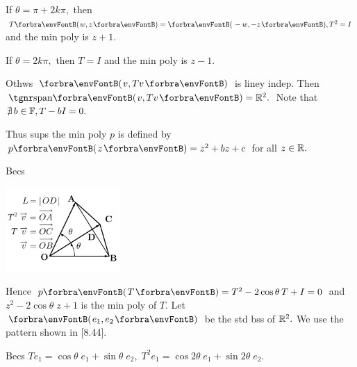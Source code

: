 \par\quad
If $\theta=\pi+2k\pi,$ then $T\Par{w,z}=\Par{-w,-z},T^2=I$ and the min poly is $z+1.$\par\quad
If $\theta=2k\pi,$ then $T=I$ and the min poly is $z-1.$\par\quad
Othws $\Par{v,Tv}$ is liney indep. Then $\Span{v,Tv}=\Rbb^2.$ Note that $\nexists\,b\in{\mathbb{F}},T-bI=0.$\par\quad
\par\vspace{-16pt}\quad
Thus sups the min poly $p$ is defined by $p\Par{z}=z^2+bz+c$ for all $z\in{\mathbb{R}}.$\par\vspace{20pt}\quad
Becs\vspace{-35pt}\par\quad
\hspace{50pt}\includegraphics[width=4.4cm,height=3.2cm,scale=0.22]{diagram5BI-1.png}\par\vspace{-70pt}\quad
{}\par\quad
Hence $p\Par{T}=T^2-2\cos\theta\, T+I=0$ and $z^2-2\cos\theta\;z+1$ is the min poly of $T.$\PfEnd\vspace{6pt}\quad
\Or Let $\Par{e_1,e_2}$ be the std bss of ${\mathbb{R}}^2.$ We use the pattern shown in [8.44].\par\quad
Becs $Te_1=\cos\theta\;e_1+\sin\theta\;e_2,\;T^2e_1=\cos2\theta\;e_1+\sin2\theta\;e_2.$\par\vspace{2pt}\quad
